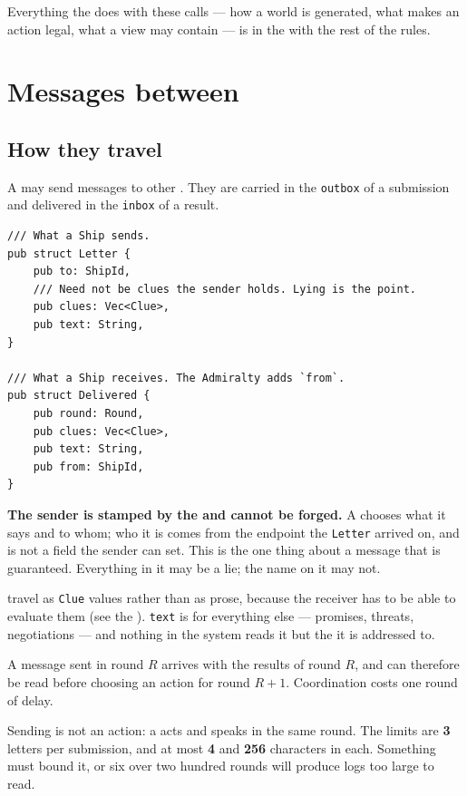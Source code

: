 \documentclass{article}
\begin{document}
Everything the \chart{} does with these calls --- how a world is generated, what makes an action
legal, what a view may contain --- is in the \MD{} with the rest of the rules.

\newpage
\section{Messages between \ships}
\label{proto:mail}

\subsection{How they travel}

A \ship{} may send messages to other \ships. They are carried in the \texttt{outbox} of a
submission and delivered in the \texttt{inbox} of a result.

\begin{lstlisting}
/// What a Ship sends.
pub struct Letter {
    pub to: ShipId,
    /// Need not be clues the sender holds. Lying is the point.
    pub clues: Vec<Clue>,
    pub text: String,
}

/// What a Ship receives. The Admiralty adds `from`.
pub struct Delivered {
    pub round: Round,
    pub clues: Vec<Clue>,
    pub text: String,
    pub from: ShipId,
}
\end{lstlisting}

\textbf{The sender is stamped by the \admiralty{} and cannot be forged.} A \ship{} chooses what it
says and to whom; who it is comes from the endpoint the \texttt{Letter} arrived on, and is not a
field the sender can set. This is the one thing about a message that is guaranteed. Everything in
it may be a lie; the name on it may not.

\clues{} travel as \texttt{Clue} values rather than as prose, because the receiver has to be able to
evaluate them (see the \MD). \texttt{text} is for everything else --- promises, threats,
negotiations --- and nothing in the system reads it but the \ship{} it is addressed to.

A message sent in round $R$ arrives with the results of round $R$, and can therefore be read before
choosing an action for round $R+1$. Coordination costs one round of delay.

Sending is not an action: a \ship{} acts and speaks in the same round. The limits are \textbf{3}
letters per submission, and at most \textbf{4} \clues{} and \textbf{256} characters in each.
Something must bound it, or six \ships over two hundred rounds will produce logs too large to
read.
\end{document}
